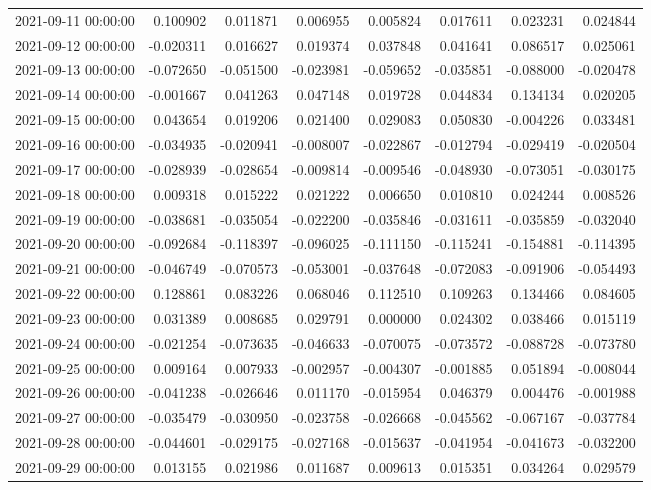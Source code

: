 \begin{tabular}{lrrrrrrr}
2021-09-11 00:00:00 & 0.100902 & 0.011871 & 0.006955 & 0.005824 & 0.017611 & 0.023231 & 0.024844 \\
2021-09-12 00:00:00 & -0.020311 & 0.016627 & 0.019374 & 0.037848 & 0.041641 & 0.086517 & 0.025061 \\
2021-09-13 00:00:00 & -0.072650 & -0.051500 & -0.023981 & -0.059652 & -0.035851 & -0.088000 & -0.020478 \\
2021-09-14 00:00:00 & -0.001667 & 0.041263 & 0.047148 & 0.019728 & 0.044834 & 0.134134 & 0.020205 \\
2021-09-15 00:00:00 & 0.043654 & 0.019206 & 0.021400 & 0.029083 & 0.050830 & -0.004226 & 0.033481 \\
2021-09-16 00:00:00 & -0.034935 & -0.020941 & -0.008007 & -0.022867 & -0.012794 & -0.029419 & -0.020504 \\
2021-09-17 00:00:00 & -0.028939 & -0.028654 & -0.009814 & -0.009546 & -0.048930 & -0.073051 & -0.030175 \\
2021-09-18 00:00:00 & 0.009318 & 0.015222 & 0.021222 & 0.006650 & 0.010810 & 0.024244 & 0.008526 \\
2021-09-19 00:00:00 & -0.038681 & -0.035054 & -0.022200 & -0.035846 & -0.031611 & -0.035859 & -0.032040 \\
2021-09-20 00:00:00 & -0.092684 & -0.118397 & -0.096025 & -0.111150 & -0.115241 & -0.154881 & -0.114395 \\
2021-09-21 00:00:00 & -0.046749 & -0.070573 & -0.053001 & -0.037648 & -0.072083 & -0.091906 & -0.054493 \\
2021-09-22 00:00:00 & 0.128861 & 0.083226 & 0.068046 & 0.112510 & 0.109263 & 0.134466 & 0.084605 \\
2021-09-23 00:00:00 & 0.031389 & 0.008685 & 0.029791 & 0.000000 & 0.024302 & 0.038466 & 0.015119 \\
2021-09-24 00:00:00 & -0.021254 & -0.073635 & -0.046633 & -0.070075 & -0.073572 & -0.088728 & -0.073780 \\
2021-09-25 00:00:00 & 0.009164 & 0.007933 & -0.002957 & -0.004307 & -0.001885 & 0.051894 & -0.008044 \\
2021-09-26 00:00:00 & -0.041238 & -0.026646 & 0.011170 & -0.015954 & 0.046379 & 0.004476 & -0.001988 \\
2021-09-27 00:00:00 & -0.035479 & -0.030950 & -0.023758 & -0.026668 & -0.045562 & -0.067167 & -0.037784 \\
2021-09-28 00:00:00 & -0.044601 & -0.029175 & -0.027168 & -0.015637 & -0.041954 & -0.041673 & -0.032200 \\
2021-09-29 00:00:00 & 0.013155 & 0.021986 & 0.011687 & 0.009613 & 0.015351 & 0.034264 & 0.029579 \\

\end{tabular}
